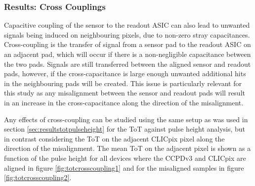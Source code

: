 \subsubsection{Results: Cross Couplings}
Capacitive coupling of the sensor to the readout ASIC can also lead to unwanted signals being induced on neighbouring pixels, due to non-zero stray capacitances. Cross-coupling is the transfer of signal from a sensor pad to the readout ASIC on an adjacent pad, which will occur if there is a non-negligible capacitance between the two pads.  Signals are still transferred between the aligned sensor and readout pads, however, if the cross-capacitance is large enough unwanted additional hits in the neighbouring pads will be created.  This issue is particularly relevant for this study as any misalignment between the sensor and readout pads will result in an increase in the cross-capacitance along the direction of the misalignment.   

Any effects of cross-coupling can be studied using the same setup as was used in section \ref{sec:resultstotpulseheight} for the ToT against pulse height analysis, but in contrast considering the ToT on the adjacent CLICpix pixel along the direction of the misalignment.  The mean ToT on the adjacent pixel is shown as a function of the pulse height for all devices where the CCPDv3 and CLICpix are aligned in figure \ref{fig:totcrosscoupling1} and for the misaligned samples in figure \ref{fig:totcrosscoupling2}.

